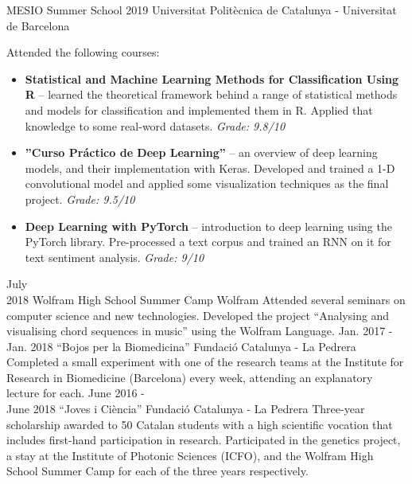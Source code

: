 \documentclass[]{twentysecondcv}
\begin{document}
\begin{adjustwidth}{10pt}{10pt}
\renewcommand{\twentylen}{10.2cm}
\begin{twenty}[2.3cm]
    {MESIO Summer School 2019}
    {Universitat Politècnica de Catalunya - Universitat de Barcelona}
    {Attended the following courses:
     \begin{itemize}
         \item \textbf{Statistical and Machine Learning Methods for Classification Using R} -- learned the theoretical framework behind a range of statistical methods and models for classification and implemented them in R. Applied that knowledge to some real-word datasets. \textit{Grade: 9.8/10}
         \item \textbf{''Curso Práctico de Deep Learning''} -- an overview of deep learning models, and their implementation with Keras. Developed and trained a 1-D convolutional model and applied some visualization techniques as the final project. \textit{Grade: 9.5/10}
         \item \textbf{Deep Learning with PyTorch} -- introduction to deep learning using the PyTorch library. Pre-processed a text corpus and trained an RNN on it for text sentiment analysis. \textit{Grade: 9/10}
     \end{itemize}
    }
    \twentyitem
    {July \\ 2018}
    {Wolfram High School Summer Camp}
    {Wolfram}
    {Attended several seminars on computer science and new technologies. Developed the project ``Analysing and visualising chord sequences in music'' using the Wolfram Language.} %
    \twentyitem
    {Jan. 2017 - \\ Jan. 2018}
    {``Bojos per la Biomedicina''}
    {Fundació Catalunya - La Pedrera}
    {Completed a small experiment with one of the research teams at the Institute for Research in Biomedicine (Barcelona) every week, attending an explanatory lecture for each.}
    \twentyitem
    {June 2016 - \\ June 2018}
    {``Joves i Ciència''}
    {Fundació Catalunya - La Pedrera}
    {Three-year scholarship awarded to 50 Catalan students with a high scientific vocation that includes first-hand participation in research. Participated in the genetics project, a stay at the Institute of Photonic Sciences (ICFO), and the Wolfram High School Summer Camp for each of the three years respectively.}
\end{twenty}


\end{adjustwidth}

\end{document}
